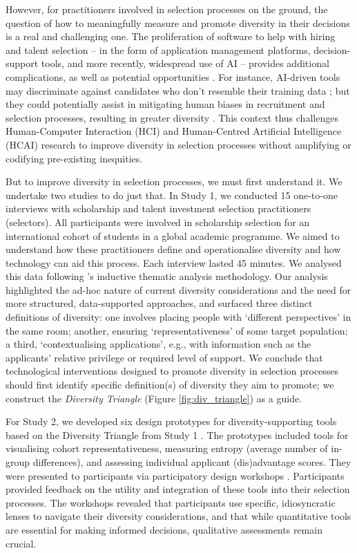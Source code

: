 However, for practitioners involved in selection processes on the ground, the question of how to meaningfully measure and promote diversity in their decisions is a real and challenging one. The proliferation of software to help with hiring and talent selection – in the form of application management platforms, decision-support tools, and more recently, widespread use of AI – provides additional complications, as well as potential opportunities \cite{Lashkari_Cheng_2023}. For instance, AI-driven tools may discriminate against candidates who don't resemble their training data \cite{chen2018investigating,li2020hiring,lambrecht2019algorithmic}; but they could potentially assist in mitigating human biases in recruitment and selection processes, resulting in greater diversity \cite{yarger2020algorithmic,avery2024does,will2023people, suhr2021does}. This context thus challenges Human-Computer Interaction (HCI) and Human-Centred Artificial Intelligence (HCAI) research to improve diversity in selection processes without amplifying or codifying pre-existing inequities.

But to improve diversity in selection processes, we must first understand it. We undertake two studies to do just that. In Study 1, we conducted 15 one-to-one interviews with scholarship and talent investment selection practitioners (selectors). All participants were involved in scholarship selection for an international cohort of students in a global academic programme. We aimed to understand how these practitioners define and operationalise diversity and how technology can aid this process. Each interview lasted 45 minutes. We analysed this data following \textcite{braun_using_2006}'s inductive thematic analysis methodology. Our analysis highlighted the ad-hoc nature of current diversity considerations and the need for more structured, data-supported approaches, and surfaced three distinct definitions of diversity: one involves placing people with `different perspectives' in the same room; another, ensuring `representativeness' of some target population; a third, `contextualising applications', e.g., with information such as the applicants' relative privilege or required level of support. We conclude that technological interventions designed to promote diversity in selection processes should first identify specific definition(s) of diversity they aim to promote; we construct the \emph{Diversity Triangle} (Figure \ref{fig:div_triangle}) as a guide.

For Study 2, we developed six design prototypes for diversity-supporting tools based on the Diversity Triangle from Study 1 \cite{Buchenau_Suri_2000}. The prototypes included tools for visualising cohort representativeness, measuring entropy (average number of in-group differences), and assessing individual applicant (dis)advantage scores. They were presented to participants via participatory design workshops \cite{Zimmerman_Forlizzi_2017}. Participants provided feedback on the utility and integration of these tools into their selection processes. The workshops revealed that participants use specific, idiosyncratic lenses to navigate their diversity considerations, and that while quantitative tools are essential for making informed decisions, qualitative assessments remain crucial.

